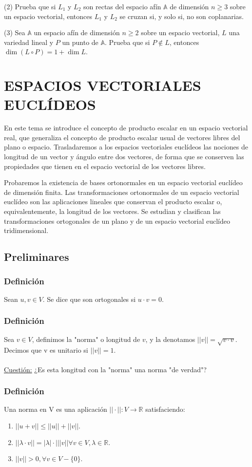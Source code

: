 \documentclass[12pt, a4paper, ones, notitlepage, openany,titlepage]{article}
\begin{document}
(2) Prueba que si $L_{1}$ y $L_{2}$ son rectas del espacio afín $\mathbb{A}$ de dimensión $n \geq 3$ sobre un espacio vectorial, entonces $L_{1}$ y $L_{2}$ se cruzan si, y solo si, no son coplanarias.

(3) Sea $\mathbb{A}$ un espacio afín de dimensión $n \geq 2$ sobre un espacio vectorial, $L$ una variedad lineal y $P$ un punto de $\mathbb{A}$. Prueba que si $P \notin L$, entonces $\dim (L \circ P)=1+\dim  L$.

\section{ESPACIOS VECTORIALES EUCLÍDEOS}
En este tema se introduce el concepto de producto escalar en un espacio vectorial real, que generaliza el concepto de producto escalar usual de vectores libres del plano o espacio. Trasladaremos a los espacios vectoriales euclídeos las nociones de longitud de un vector y ángulo entre dos vectores, de forma que se conserven las propiedades que tienen en el espacio vectorial de los vectores libres.

Probaremos la existencia de bases ortonormales en un espacio vectorial euclídeo de dimensión finita. Las transformaciones ortonormales de un espacio vectorial euclídeo son las aplicaciones lineales que conservan el producto escalar o, equivalentemente, la longitud de los vectores. Se estudian y clasifican las transformaciones ortogonales de un plano y de un espacio vectorial euclídeo tridimensional.

\subsection{Preliminares}
\subsubsection{Definición}
Sean $u,v \in V$. Se dice que son ortogonales si $u\cdot v = 0$.

\subsubsection{Definición}
Sea $v \in V$, definimos la "norma" o longitud de $v$, y la denotamos $||v|| = \sqrt{v \cdot v}$. Decimos que v es unitario si $||v|| = 1$.\\\\
\underline{Cuestión:}
¿Es esta longitud con la "norma" una norma "de verdad"?

\subsubsection{Definición}
Una norma en V es una aplicación $||\cdot|| : V \longrightarrow \mathbb{R}$ satisfaciendo:
\begin{enumerate}
	\item $||u + v || \le ||u|| + ||v||$.
	\item $||\lambda \cdot v|| = |\lambda| \cdot| ||v|| \forall v \in V, \lambda \in \mathbb{R}$.
	\item $||v|| > 0, \forall v \in V - \{0\}$.
\end{enumerate}
\end{document}
